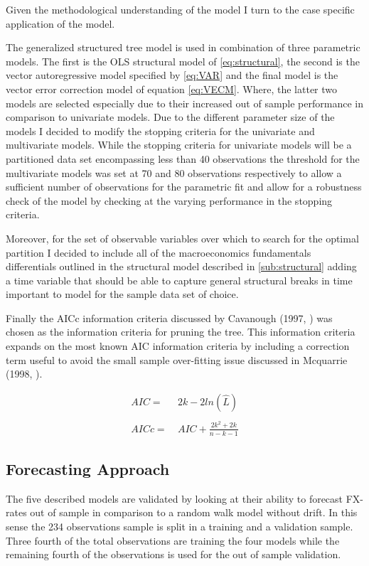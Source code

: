 \setlength{\leftskip}{0pt}
\setlength{\rightskip}{0pt}

Given the methodological understanding of the model I turn to the case
specific application of the model.

The generalized structured tree model is used in combination of three
parametric models. The first is the OLS structural model of
\ref{eq:structural}, the second is the vector autoregressive model
specified by \ref{eq:VAR} and the final model is the vector error
correction model of equation \ref{eq:VECM}. Where, the latter two
models are selected especially due to their increased out of sample
performance in comparison to univariate models. Due to the different
parameter size of the models I decided to modify the stopping criteria
for the univariate and multivariate models. While the stopping
criteria for univariate models will be a partitioned data set
encompassing less than 40 observations the threshold for the
multivariate models was set at 70 and 80 observations respectively to
allow a sufficient number of observations for the parametric fit and
allow for a robustness check of the model by checking at the varying
performance in the stopping criteria.

Moreover, for the set of observable variables over which to search for
the optimal partition I decided to include all of the macroeconomics
fundamentals differentials outlined in the structural model described
in \ref{sub:structural} adding a time variable that should be able to
capture general structural breaks in time important to model for the
sample data set of choice.

Finally the AICc information criteria discussed by Cavanough (1997,
\cite{Cavanough}) was chosen as the information criteria for pruning
the tree. This information criteria expands on the most known AIC
information criteria by including a correction term useful to avoid the
small sample over-fitting issue discussed in Mcquarrie (1998,
\cite{Mcquarrie}).

\begin{align}
  AIC =& \ 2k - 2ln(\hat{L}) \nonumber \\
  \label{eq:AICc} \\
  AICc =& \ AIC + \frac{2k^2 + 2k}{n - k - 1} \nonumber
\end{align}


\subsection{Forecasting Approach}
\label{sub:forecast}
The five described models are validated by looking at their ability to
forecast FX-rates out of sample in comparison to a random walk model
without drift. In this sense the 234 observations sample is split in a
training and a validation sample. Three fourth of the total
observations are training the four models while the remaining fourth
of the observations is used for the out of sample validation.

